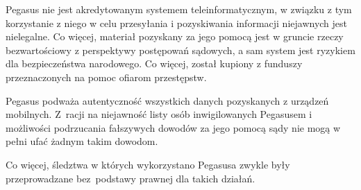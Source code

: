 \documentclass{article}
\begin{document}
Pegasus nie jest akredytowanym systemem teleinformatycznym, w związku z tym korzystanie z niego w celu przesyłania i pozyskiwania informacji niejawnych jest nielegalne. Co więcej, materiał pozyskany za jego pomocą jest w gruncie rzeczy bezwartościowy z perspektywy postępowań sądowych, a sam system jest ryzykiem dla bezpieczeństwa narodowego. Co więcej, został kupiony z funduszy przeznaczonych na pomoc ofiarom przestępstw.

Pegasus podważa autentyczność wszystkich danych pozyskanych z urządzeń mobilnych. Z~racji na niejawność listy osób inwigilowanych Pegasusem i możliwości podrzucania fałszywych dowodów za jego pomocą sądy nie mogą w pełni ufać żadnym takim dowodom.

Co więcej, śledztwa w których wykorzystano Pegasusa zwykle były przeprowadzane bez~podstawy prawnej dla takich działań.
\end{document}
